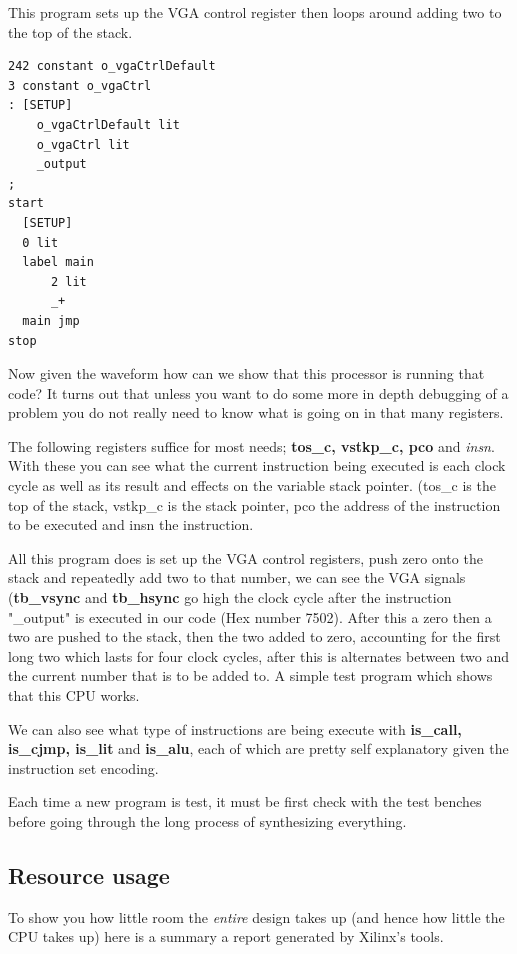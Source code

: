 \documentclass	[a4paper, 10pt]	{article}
\begin{document}
      This program sets up the VGA control register then loops around adding two to the top
      of the stack.

\begin{verbatim}
242 constant o_vgaCtrlDefault 
3 constant o_vgaCtrl
: [SETUP]
    o_vgaCtrlDefault lit
    o_vgaCtrl lit 
    _output
;
start
  [SETUP]
  0 lit
  label main
      2 lit
      _+
  main jmp
stop 
\end{verbatim}

    Now given the waveform how can we show that this processor is running that code? It turns
    out that unless you want to do some more in depth debugging of a problem you do not really
    need to know what is going on in that many registers.

    The following registers suffice for most needs; \textbf{tos\_c, vstkp\_c, pco} and \emph{insn}.
    With these you can see what the current instruction being executed is each clock cycle as
    well as its result and effects on the variable stack pointer. (tos\_c is the top of the stack,
    vstkp\_c is the stack pointer, pco the address of the instruction to be executed and insn the
    instruction. 

    All this program does is set up the VGA control registers, push zero onto the stack and
    repeatedly add two to that number, we can see the VGA signals (\textbf{tb\_vsync} and \textbf{tb\_hsync}
    go high the clock cycle after the instruction "\_output" is executed in our code (Hex number
    7502). After this a zero then a two are pushed to the stack, then the two added to zero,
    accounting for the first long two which lasts for four clock cycles, after this is alternates
    between two and the current number that is to be added to. A simple test program which
    shows that this CPU works.

    We can also see what type of instructions are being execute with \textbf{is\_call, is\_cjmp,
    is\_lit} and \textbf{is\_alu}, each of which are pretty self explanatory given the instruction
    set encoding.

    Each time a new program is test, it must be first check with the test benches before going
    through the long process of synthesizing everything.

    \subsection{Resource usage}

    To show you how little room the \emph{entire} design takes up (and hence how little the
    CPU takes up) here is a summary a report generated by Xilinx's tools.
\end{document}
